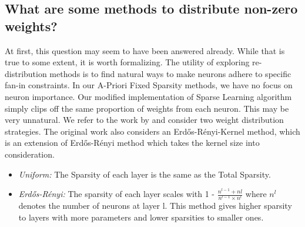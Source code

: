 \subsection{What are some methods to distribute non-zero weights?}
At first, this question may seem to have been answered already. While that is true to some extent, it is worth formalizing. The utility of exploring re-distribution methods is to find natural ways to make neurons adhere to specific fan-in constraints. In our A-Priori Fixed Sparsity methods, we have no focus on neuron importance. Our modified implementation of Sparse Learning algorithm simply clips off the same proportion of weights from each neuron. This may be very unnatural. We refer to the work by \cite{evci2019rigging} and consider two weight distribution strategies. The original work also considers an {Erd\H{o}s-R\'{e}nyi-Kernel} method, which is an extension of {Erd\H{o}s-R\'{e}nyi} method which takes the kernel size into consideration. 
\begin{itemize}
    \item \textit{Uniform:} The Sparsity of each layer is the same as the Total Sparsity.
    \item \textit{Erd\H{o}s-R\'{e}nyi:} The sparsity of each layer scales with 1 - $\frac{n^{l-1} + n{l}}{n^{l-1}\times n^{l}}$ where $n^{l}$ denotes the number of neurons at layer l. This method gives higher sparsity to layers with more parameters and lower sparsities to smaller ones.
\end{itemize}

